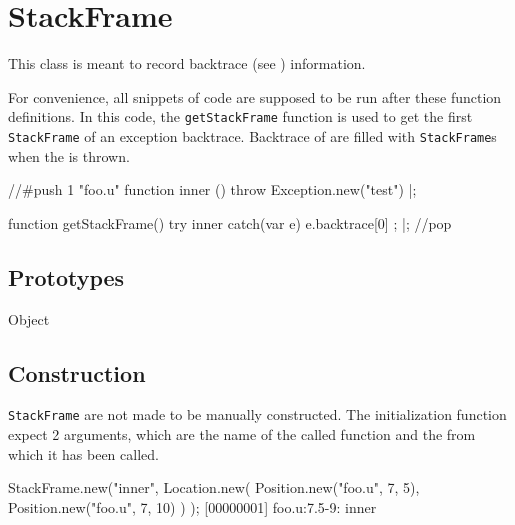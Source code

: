 
\section{StackFrame}

This class is meant to record backtrace (see )
information.

For convenience, all snippets of code are supposed to be run after these
function definitions.  In this code, the \lstinline|getStackFrame| function
is used to get the first \lstinline|StackFrame| of an exception backtrace.
Backtrace of  are filled with \lstinline|StackFrame|s
when the is thrown.

\begin{urbiscript}
//#push 1 "foo.u"
function inner () { throw Exception.new("test") }|;

function getStackFrame()
{
  try
  {
    inner
  }
  catch(var e)
  {
    e.backtrace[0]
  };
}|;
//pop
\end{urbiscript}

\experimental{}

\subsection{Prototypes}
\begin{refObjects}
\item[Object]
\end{refObjects}

\subsection{Construction}

\lstinline|StackFrame| are not made to be manually constructed.  The
initialization function expect 2 arguments, which are the name of the called
function and the  from which it has been called.

\begin{urbiscript}
StackFrame.new("inner",
  Location.new(
    Position.new("foo.u", 7, 5),
    Position.new("foo.u", 7, 10)
  )
);
[00000001] foo.u:7.5-9: inner
\end{urbiscript}

